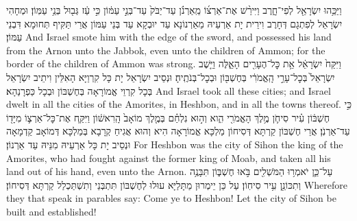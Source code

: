 {וַיַּכֵּ֥הוּ יִשְׂרָאֵ֖ל לְפִי־חָ֑רֶב וַיִּירַ֨שׁ אֶת־אַרְצ֜וֹ מֵֽאַרְנֹ֗ן עַד־יַבֹּק֙ עַד־בְּנֵ֣י עַמּ֔וֹן כִּ֣י עַ֔ז גְּב֖וּל בְּנֵ֥י עַמּֽוֹן׃
}
{וּמְחָהִי יִשְׂרָאֵל לְפִתְגָם דְּחָרֶב וִירֵית יָת אַרְעֵיהּ מֵאַרְנוֹנָא עַד יוּבְקָא עַד בְּנֵי עַמּוֹן אֲרֵי תַּקִּיף תְּחוּמָא דִּבְנֵי עַמּוֹן׃}
{And Israel smote him with the edge of the sword, and possessed his land from the Arnon unto the Jabbok, even unto the children of Ammon; for the border of the children of Ammon was strong.}{}
{וַיִּקַּח֙ יִשְׂרָאֵ֔ל אֵ֥ת כׇּל־הֶעָרִ֖ים הָאֵ֑לֶּה וַיֵּ֤שֶׁב יִשְׂרָאֵל֙ בְּכׇל־עָרֵ֣י הָֽאֱמֹרִ֔י בְּחֶשְׁבּ֖וֹן וּבְכׇל־בְּנֹתֶֽיהָ׃
}
{וּנְסֵיב יִשְׂרָאֵל יָת כָּל קִרְוַיָּא הָאִלֵּין וִיתֵיב יִשְׂרָאֵל בְּכָל קִרְוֵי אֱמוֹרָאָה בְּחֶשְׁבּוֹן וּבְכָל כַּפְרָנַהָא׃}
{And Israel took all these cities; and Israel dwelt in all the cities of the Amorites, in Heshbon, and in all the towns thereof.}{}
{כִּ֣י חֶשְׁבּ֔וֹן עִ֗יר סִיחֹ֛ן מֶ֥לֶךְ הָאֱמֹרִ֖י הִ֑וא וְה֣וּא נִלְחַ֗ם בְּמֶ֤לֶךְ מוֹאָב֙ הָֽרִאשׁ֔וֹן וַיִּקַּ֧ח אֶת־כׇּל־אַרְצ֛וֹ מִיָּד֖וֹ עַד־אַרְנֹֽן׃
}
{אֲרֵי חֶשְׁבּוֹן קַרְתָּא דְּסִיחוֹן מַלְכָּא אֱמוֹרָאָה הִיא וְהוּא אֲגִיחַ קְרָבָא בְּמַלְכָּא דְּמוֹאָב קַדְמָאָה וּנְסֵיב יָת כָּל אַרְעֵיהּ מִנֵּיהּ עַד אַרְנוֹן׃}
{For Heshbon was the city of Sihon the king of the Amorites, who had fought against the former king of Moab, and taken all his land out of his hand, even unto the Arnon.}{}
{עַל־כֵּ֛ן יֹאמְר֥וּ הַמֹּשְׁלִ֖ים בֹּ֣אוּ חֶשְׁבּ֑וֹן תִּבָּנֶ֥ה וְתִכּוֹנֵ֖ן עִ֥יר סִיחֽוֹן׃
}
{עַל כֵּן יֵימְרוּן מַתָּלַיָּא עוּלוּ לְחֶשְׁבּוֹן תִּתְבְּנֵי וְתִשְׁתַּכְלַל קַרְתָּא דְּסִיחוֹן׃}
{Wherefore they that speak in parables say: Come ye to Heshbon! Let the city of Sihon be built and established!}{}
